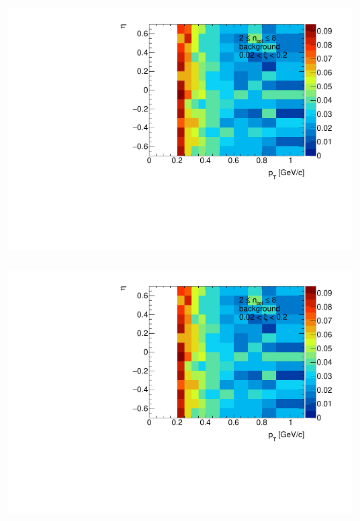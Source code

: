 \begin{figure}[b!]
	\centering
	\begin{subfigure}{.49\textwidth}
		\includegraphics[width=\linewidth, page=1]{chapters/chrgSTAR/img/chargedBkg/bkg2D.pdf}
	\end{subfigure}
	\begin{subfigure}{.49\textwidth}
		\includegraphics[width=\linewidth, page=7]{chapters/chrgSTAR/img/chargedBkg/bkg2D_epos.pdf}
	\end{subfigure}

\end{figure}

